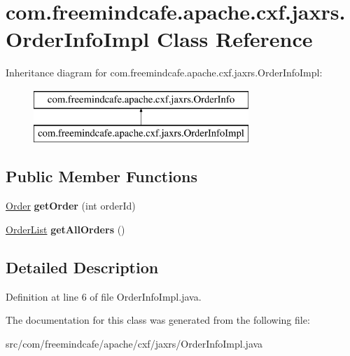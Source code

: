 \hypertarget{classcom_1_1freemindcafe_1_1apache_1_1cxf_1_1jaxrs_1_1_order_info_impl}{}\section{com.\+freemindcafe.\+apache.\+cxf.\+jaxrs.\+Order\+Info\+Impl Class Reference}
\label{classcom_1_1freemindcafe_1_1apache_1_1cxf_1_1jaxrs_1_1_order_info_impl}
Inheritance diagram for com.\+freemindcafe.\+apache.\+cxf.\+jaxrs.\+Order\+Info\+Impl\+:\begin{figure}[H]
\begin{center}
\leavevmode
\includegraphics[height=2.000000cm]{classcom_1_1freemindcafe_1_1apache_1_1cxf_1_1jaxrs_1_1_order_info_impl}
\end{center}
\end{figure}
\subsection*{Public Member Functions}
\begin{DoxyCompactItemize}
\item 
\hypertarget{classcom_1_1freemindcafe_1_1apache_1_1cxf_1_1jaxrs_1_1_order_info_impl_a146b0623f7e2d1254f7ec5754fda4766}{}\hyperlink{classcom_1_1freemindcafe_1_1apache_1_1cxf_1_1jaxrs_1_1_order}{Order} {\bfseries get\+Order} (int order\+Id)\label{classcom_1_1freemindcafe_1_1apache_1_1cxf_1_1jaxrs_1_1_order_info_impl_a146b0623f7e2d1254f7ec5754fda4766}

\item 
\hypertarget{classcom_1_1freemindcafe_1_1apache_1_1cxf_1_1jaxrs_1_1_order_info_impl_ab640971da3ab7dc44e39c7e5b208f704}{}\hyperlink{classcom_1_1freemindcafe_1_1apache_1_1cxf_1_1jaxrs_1_1_order_list}{Order\+List} {\bfseries get\+All\+Orders} ()\label{classcom_1_1freemindcafe_1_1apache_1_1cxf_1_1jaxrs_1_1_order_info_impl_ab640971da3ab7dc44e39c7e5b208f704}

\end{DoxyCompactItemize}


\subsection{Detailed Description}


Definition at line 6 of file Order\+Info\+Impl.\+java.



The documentation for this class was generated from the following file\+:\begin{DoxyCompactItemize}
\item 
src/com/freemindcafe/apache/cxf/jaxrs/Order\+Info\+Impl.\+java\end{DoxyCompactItemize}
